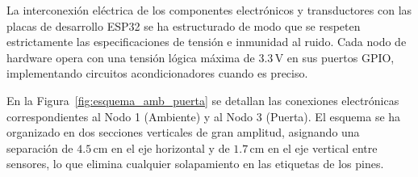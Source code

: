 La interconexión eléctrica de los componentes electrónicos y transductores con las placas de desarrollo ESP32 se ha estructurado de modo que se respeten estrictamente las especificaciones de tensión e inmunidad al ruido. Cada nodo de hardware opera con una tensión lógica máxima de $3.3\,\text{V}$ en sus puertos GPIO, implementando circuitos acondicionadores cuando es preciso.

En la Figura~\ref{fig:esquema_amb_puerta} se detallan las conexiones electrónicas correspondientes al Nodo 1 (Ambiente) y al Nodo 3 (Puerta). El esquema se ha organizado en dos secciones verticales de gran amplitud, asignando una separación de $4.5\,\text{cm}$ en el eje horizontal y de $1.7\,\text{cm}$ en el eje vertical entre sensores, lo que elimina cualquier solapamiento en las etiquetas de los pines.

